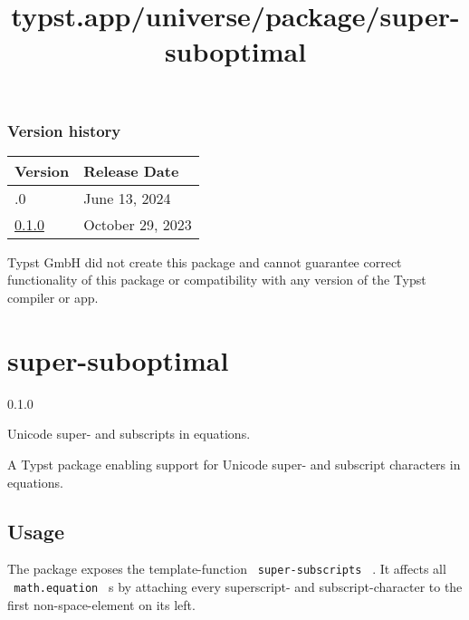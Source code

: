 \label{versions}
\subsubsection{Version history}\label{version-history}

\begin{longtable}[]{@{}ll@{}}
\toprule\noalign{}
Version & Release Date \\
\midrule\noalign{}
\endhead
\bottomrule\noalign{}
\endlastfoot
0.2.0 & June 13, 2024 \\
\href{https://typst.app/universe/package/typearea/0.1.0/}{0.1.0} &
October 29, 2023 \\
\end{longtable}

Typst GmbH did not create this package and cannot guarantee correct
functionality of this package or compatibility with any version of the
Typst compiler or app.


\title{typst.app/universe/package/super-suboptimal}

\label{banner}
\section{super-suboptimal}\label{super-suboptimal}

{ 0.1.0 }

Unicode super- and subscripts in equations.

\label{readme}
A Typst package enabling support for Unicode super- and subscript
characters in equations.

\subsection{Usage}\label{usage}

The package exposes the template-function \texttt{\ super-subscripts\ }
. It affects all \texttt{\ math.equation\ } s by attaching every
superscript- and subscript-character to the first non-space-element on
its left.

\begin{Shaded}
\begin{Highlighting}[]

\NormalTok{$}
\NormalTok{$}
\end{Highlighting}
\end{Shaded}

